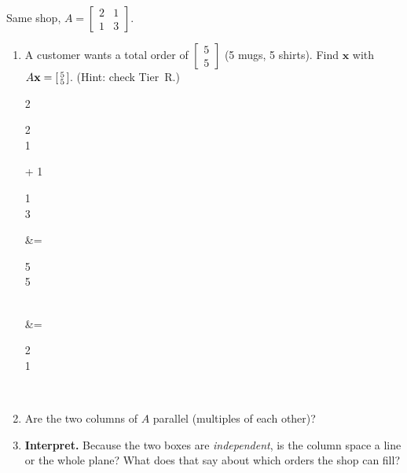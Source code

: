 \documentclass[10pt]{article}
\newcommand{\xx}{\mathbf{x}}
\begin{document}
\begin{tcolorbox}[colback=white, colframe=black!40, title=\textbf{Tier A --- Approaching Proficiency},
    fonttitle=\bfseries, arc=1.5mm, left=3mm, right=3mm, top=2mm, bottom=2mm, breakable]
Same shop, $A=\begin{bmatrix} 2 & 1 \\ 1 & 3 \end{bmatrix}$.
\begin{enumerate}[leftmargin=1.7em, itemsep=8pt]
  \item A customer wants a total order of $\begin{bmatrix} 5 \\ 5 \end{bmatrix}$ (5 mugs, 5 shirts).
        Find $\xx$ with $A\xx=\begin{bsmallmatrix} 5\\5 \end{bsmallmatrix}$. (Hint: check Tier~R.)
\begin{work}
  2\begin{bsmallmatrix} 2\\1 \end{bsmallmatrix} + 1\begin{bsmallmatrix} 1\\3 \end{bsmallmatrix}
      &= \begin{bsmallmatrix} 5\\5 \end{bsmallmatrix} \\
  \xx &= \begin{bsmallmatrix} 2\\1 \end{bsmallmatrix}
      \ 
\end{work}
  \item Are the two columns of $A$ parallel (multiples of each other)?
  \item \textbf{Interpret.} Because the two boxes are \emph{independent}, is the column space a
        line or the whole plane? What does that say about which orders the shop can fill?
\end{enumerate}
\end{tcolorbox}
\end{document}
